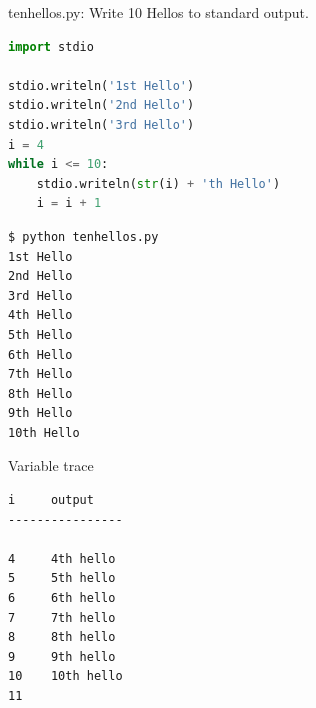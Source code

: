 \documentclass[8pt,a4paper,compress]{beamer}
\begin{document}
\begin{frame}[fragile]
\pause

\begin{framed}
\tiny tenhellos.py: Write 10 Hellos to standard output.
\end{framed}

\begin{lstlisting}[language=Python]
import stdio

stdio.writeln('1st Hello')
stdio.writeln('2nd Hello')
stdio.writeln('3rd Hello')
i = 4
while i <= 10:
    stdio.writeln(str(i) + 'th Hello')
    i = i + 1
\end{lstlisting}

\pause

\begin{minipage}{150pt}
\begin{lstlisting}[language={}]
$ python tenhellos.py 
1st Hello
2nd Hello
3rd Hello
4th Hello
5th Hello
6th Hello
7th Hello
8th Hello
9th Hello
10th Hello
\end{lstlisting}
\end{minipage}\hfill
\begin{minipage}{100pt}
Variable trace
\begin{lstlisting}[language={}]
i     output
----------------

4     4th hello
5     5th hello
6     6th hello
7     7th hello
8     8th hello
9     9th hello
10    10th hello
11
\end{lstlisting}
\end{minipage}
\end{frame}
\end{document}
